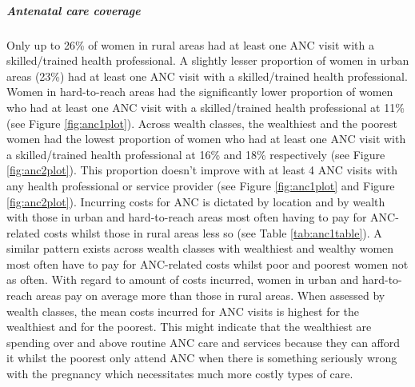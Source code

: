 \documentclass[12pt,a4paper]{article}
\let\oldsubparagraph\subparagraph
\renewcommand{\subparagraph}[1]{\oldsubparagraph{#1}\mbox{}}
\begin{document}
\hypertarget{ancCoverage}{%
\subparagraph{Antenatal care coverage}\label{ancCoverage}}

Only up to 26\% of women in rural areas had at least one ANC visit with a skilled/trained health professional. A slightly lesser proportion of women in urban areas (23\%) had at least one ANC visit with a skilled/trained health professional. Women in hard-to-reach areas had the significantly lower proportion of women who had at least one ANC visit with a skilled/trained health professional at 11\% (see Figure \ref{fig:anc1plot}). Across wealth classes, the wealthiest and the poorest women had the lowest proportion of women who had at least one ANC visit with a skilled/trained health professional at 16\% and 18\% respectively (see Figure \ref{fig:anc2plot}). This proportion doesn't improve with at least 4 ANC visits with any health professional or service provider (see Figure \ref{fig:anc1plot} and Figure \ref{fig:anc2plot}). Incurring costs for ANC is dictated by location and by wealth with those in urban and hard-to-reach areas most often having to pay for ANC-related costs whilst those in rural areas less so (see Table \ref{tab:anc1table}). A similar pattern exists across wealth classes with wealthiest and wealthy women most often have to pay for ANC-related costs whilst poor and poorest women not as often. With regard to amount of costs incurred, women in urban and hard-to-reach areas pay on average more than those in rural areas. When assessed by wealth classes, the mean costs incurred for ANC visits is highest for the wealthiest and for the poorest. This might indicate that the wealthiest are spending over and above routine ANC care and services because they can afford it whilst the poorest only attend ANC when there is something seriously wrong with the pregnancy which necessitates much more costly types of care.
\end{document}
